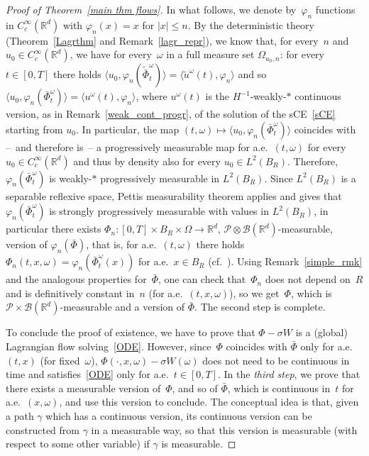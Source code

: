 \documentclass[a4paper,10pt]{article}
\newcommand\1{\mathbbm{1}}
\newcommand{\mr}{\mathbb{R}}
\newcommand{\mc}{\mathcal}
\newcommand{\lan}{\langle}
\newcommand{\ran}{\rangle}
\newcommand{\td}{\tilde}
\numberwithin{equation}{section}
\begin{document}
\begin{proof}[Proof of Theorem~\ref{main thm flows}]
In what follows, we denote by~$\varphi_n$ functions in $C^\infty_c(\mr^d)$ with $\varphi_n(x)=x$ for $|x|\le n$. By the deterministic theory (Theorem~\ref{Lagrthm} and Remark~\ref{lagr_repr}), we know that, for every~$n$ and $u_0 \in C^\infty_c(\mr^d)$, we have for every~$\omega$ in a full measure set $\Omega_{u_0,n}$: for every~$t \in [0,T]$ there holds $\lan u_0,\varphi_n(\td{\bar{\Phi}}_t^\omega)\ran = \lan \td{u}^\omega(t),\varphi_n\ran$ and so $\lan u_0,\varphi_n(\bar{\Phi}_t^\omega)\ran = \lan u^\omega(t),\varphi_n\ran$, where $u^\omega(t)$ is the $H^{-1}$-weakly-$*$ continuous version, as in Remark~\ref{weak_cont_progr}, of the solution of the sCE~\eqref{sCE} starting from $u_0$. In particular, the map $(t,\omega)\mapsto \lan u_0,\varphi_n(\bar{\Phi}_t^\omega)\ran$ coincides with --~and therefore is~-- a progressively measurable map for a.e.~$(t,\omega)$ for every $u_0 \in C^\infty_c(\mr^d)$ and thus by density also for every $u_0 \in L^2(B_R)$. Therefore, $\varphi_n(\bar{\Phi}_t^\omega)$ is weakly-$*$ progressively measurable in $L^2(B_R)$. Since $L^2(B_R)$ is a separable reflexive space, Pettis measurability theorem applies and gives that $\varphi_n(\bar{\Phi}_t^\omega)$ is strongly progressively measurable with values in $L^2(B_R)$, in particular there exists $\Phi_n:[0,T]\times B_R\times \Omega\rightarrow\mr^d$, $\mc{P}\otimes\mc{B}(\mr^d)$-measurable, version of $\varphi_n(\bar{\Phi})$, that is, for a.e.~$(t,\omega)$ there holds $\Phi_n(t,x,\omega)=\varphi_n(\bar{\Phi}_t^\omega(x))$ for a.e.~$x\in B_R$ (cf.~\cite[Proposition~A.6]{MAURELLIPHD}). Using Remark~\ref{simple_rmk} and the analogous properties for~$\bar{\Phi}$, one can check that~$\Phi_n$ does not depend on~$R$ and is definitively constant in~$n$ (for a.e.~$(t,x,\omega)$), so we get~$\Phi$, which is $\mc{P}\times\mc{B}(\mr^d)$-measurable and a version of $\bar{\Phi}$. The second step is complete.

To conclude the proof of existence, we have to prove that $\Phi -\sigma W$ is a (global) Lagrangian flow solving~\eqref{ODE}. However, since~$\Phi$ coincides with $\bar{\Phi}$ only for a.e. $(t,x)$ (for fixed~$\omega$), $\Phi(\cdot,x,\omega) -\sigma W(\omega)$ does not need to be continuous in time and satisfies~\eqref{ODE} only for a.e.~$t \in [0,T]$. In the \emph{third step}, we prove that there exists a measurable version of~$\Phi$, and so of $\bar{\Phi}$, which is continuous in~$t$ for a.e.~$(x,\omega)$, and use this version to conclude. The conceptual idea is that, given a path $\gamma$ which has a continuous version, its continuous version can be constructed from $\gamma$ in a measurable way, so that this version is measurable (with respect to some other variable) if $\gamma$ is measurable.


\end{proof}
\end{document}
